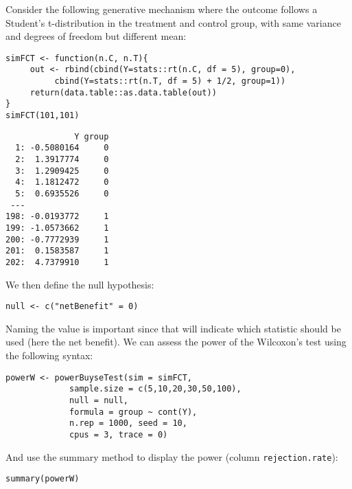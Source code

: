 \documentclass[12pt]{article}
\begin{document}
\bigskip

Consider the following generative mechanism where the outcome follows
a Student's t-distribution in the treatment and control group, with same
variance and degrees of freedom but different mean:
\lstset{language=r,label= ,caption= ,captionpos=b,numbers=none}
\begin{lstlisting}
simFCT <- function(n.C, n.T){
     out <- rbind(cbind(Y=stats::rt(n.C, df = 5), group=0),
		  cbind(Y=stats::rt(n.T, df = 5) + 1/2, group=1))
     return(data.table::as.data.table(out))
}
simFCT(101,101)
\end{lstlisting}

\begin{verbatim}
              Y group
  1: -0.5080164     0
  2:  1.3917774     0
  3:  1.2909425     0
  4:  1.1812472     0
  5:  0.6935526     0
 ---                 
198: -0.0193772     1
199: -1.0573662     1
200: -0.7772939     1
201:  0.1583587     1
202:  4.7379910     1
\end{verbatim}

We then define the null hypothesis:
\lstset{language=r,label= ,caption= ,captionpos=b,numbers=none}
\begin{lstlisting}
null <- c("netBenefit" = 0)
\end{lstlisting}

Naming the value is important since that will indicate which statistic
should be used (here the net benefit). We can assess the power of the
Wilcoxon's test using the following syntax:
\lstset{language=r,label= ,caption= ,captionpos=b,numbers=none}
\begin{lstlisting}
powerW <- powerBuyseTest(sim = simFCT, 
			 sample.size = c(5,10,20,30,50,100),
			 null = null,
			 formula = group ~ cont(Y), 
			 n.rep = 1000, seed = 10,
			 cpus = 3, trace = 0)
\end{lstlisting}

\clearpage

And use the summary method to display the power (column
\texttt{rejection.rate}):
\lstset{language=r,label= ,caption= ,captionpos=b,numbers=none}
\begin{lstlisting}
summary(powerW)
\end{lstlisting}
\end{document}
